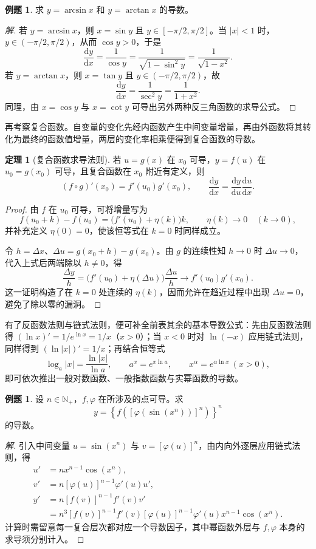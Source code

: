 \documentclass[UTF8,fontset=fandol,a4paper,12pt]{ctexart}
\newcommand{\dd}{\mathrm d}
\theoremstyle{definition}
\newtheorem{theorem}[definition]{定理}
\newtheorem{example}[definition]{例题}
\begin{document}
\begin{example}
求 $y=\arcsin x$ 和 $y=\arctan x$ 的导数。
\end{example}
\begin{proof}[解]
若 $y=\arcsin x$，则 $x=\sin y$ 且 $y\in[-\pi/2,\pi/2]$。当 $|x|<1$ 时，$y\in(-\pi/2,\pi/2)$，从而 $\cos y>0$，于是
\[
 \frac{\dd y}{\dd x}=\frac1{\cos y}
 =\frac1{\sqrt{1-\sin^2y}}=\frac1{\sqrt{1-x^2}}.
\]
若 $y=\arctan x$，则 $x=\tan y$ 且 $y\in(-\pi/2,\pi/2)$，故
\[
 \frac{\dd y}{\dd x}=\frac1{\sec^2y}=\frac1{1+x^2}.
\]
同理，由 $x=\cos y$ 与 $x=\cot y$ 可导出另外两种反三角函数的求导公式。
\end{proof}

再考察复合函数。自变量的变化先经内函数产生中间变量增量，再由外函数将其转化为最终的函数值增量，两层的变化率相乘便得到复合函数的导数。

\begin{theorem}[复合函数求导法则]
若 $u=g(x)$ 在 $x_0$ 可导，$y=f(u)$ 在 $u_0=g(x_0)$ 可导，且复合函数在 $x_0$ 附近有定义，则
\[
 (f\circ g)'(x_0)=f'(u_0)g'(x_0),
 \qquad \frac{\dd y}{\dd x}=\frac{\dd y}{\dd u}\frac{\dd u}{\dd x}.
\]
\end{theorem}
\begin{proof}
由 $f$ 在 $u_0$ 可导，可将增量写为
\[
 f(u_0+k)-f(u_0)=\bigl(f'(u_0)+\eta(k)\bigr)k,
 \qquad \eta(k)\to0\quad(k\to0),
\]
并补充定义 $\eta(0)=0$，使该恒等式在 $k=0$ 时同样成立。

令 $h=\Delta x$、$\Delta u=g(x_0+h)-g(x_0)$。由 $g$ 的连续性知 $h\to0$ 时 $\Delta u\to0$，代入上式后两端除以 $h\ne0$，得
\[
 \frac{\Delta y}{h}
 =\bigl(f'(u_0)+\eta(\Delta u)\bigr)\frac{\Delta u}{h}
 \longrightarrow f'(u_0)g'(x_0).
\]
这一证明构造了在 $k=0$ 处连续的 $\eta(k)$，因而允许在趋近过程中出现 $\Delta u=0$，避免了除以零的漏洞。
\end{proof}

有了反函数法则与链式法则，便可补全前表其余的基本导数公式：先由反函数法则得 $(\ln x)'=1/e^{\ln x}=1/x$（$x>0$）；当 $x<0$ 时对 $\ln(-x)$ 应用链式法则，同样得到 $(\ln|x|)'=1/x$；再结合恒等式
\[
 \log_a|x|=\frac{\ln|x|}{\ln a},\qquad
 a^x=e^{x\ln a},\qquad x^\alpha=e^{\alpha\ln x}\ (x>0),
\]
即可依次推出一般对数函数、一般指数函数与实幂函数的导数。

\begin{example}
设 $n\in\mathbb N_+$，$f,\varphi$ 在所涉及的点可导。求
\[
 y=\left\{f\left([\varphi(\sin(x^n))]^n\right)\right\}^n
\]
的导数。
\end{example}
\begin{proof}[解]
引入中间变量 $u=\sin(x^n)$ 与 $v=[\varphi(u)]^n$，由内向外逐层应用链式法则，得
\begin{align*}
 u'&=nx^{n-1}\cos(x^n),\\
 v'&=n[\varphi(u)]^{n-1}\varphi'(u)u',\\
 y'&=n[f(v)]^{n-1}f'(v)v'\\
 &=n^3[f(v)]^{n-1}f'(v)[\varphi(u)]^{n-1}
 \varphi'(u)x^{n-1}\cos(x^n).
\end{align*}
计算时需留意每一复合层次都对应一个导数因子，其中幂函数外层与 $f,\varphi$ 本身的求导须分别计入。
\end{proof}
\end{document}
